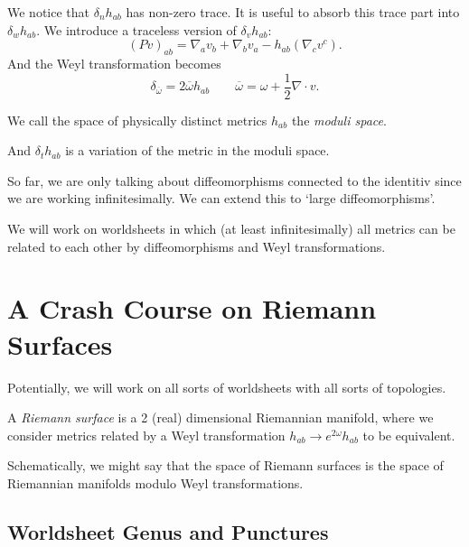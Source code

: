 We notice that $\delta_n h_{ab}$ has non-zero trace. It is useful to absorb this trace part into $\delta_w h_{ab}$.
We introduce a traceless version of $\delta_v h_{ab}$:
\begin{equation}
  \label{eq:Pv}
  \boxed{(P v)_{ab} = \nabla_a v_b + \nabla_b v_a - h_{ab} (\nabla_c v^c)}.
\end{equation}
And the Weyl transformation becomes 
\begin{equation}
  \delta_{\overline{\omega}{}} = 2 \overline{\omega}{} h_{ab} \qquad \overline{\omega}{} = \omega + \frac{1}{2} \nabla \cdot v.
\end{equation}
\begin{definition}[]
  We call the space of physically distinct metrics $h_{ab}$ the \emph{moduli space}.
\end{definition}
And $\delta_t h_{ab}$ is a variation of the metric in the moduli space.

\begin{leftbar}
  So far, we are only talking about diffeomorphisms connected to the identitiv since we are working infinitesimally. We can extend this to `large diffeomorphisms'.
\end{leftbar}
We will work on worldsheets in which (at least infinitesimally) all metrics can be related to each other by diffeomorphisms and Weyl transformations.

\section{A Crash Course on Riemann Surfaces}%
\label{sec:a_crash_course_on_riemann_surfaces}

Potentially, we will work on all sorts of worldsheets with all sorts of topologies.
\begin{definition}
  A \emph{Riemann surface} is a 2 (real) dimensional Riemannian manifold, where we consider metrics related by a Weyl transformation $ h_{ab} \to e^{2 \omega} h_{ab} $ to be equivalent.
\end{definition}
Schematically, we might say that the space of Riemann surfaces is the space of Riemannian manifolds modulo Weyl transformations.

\subsection{Worldsheet Genus and Punctures}%
\label{sub:worldsheet_genus_and_punctures}

